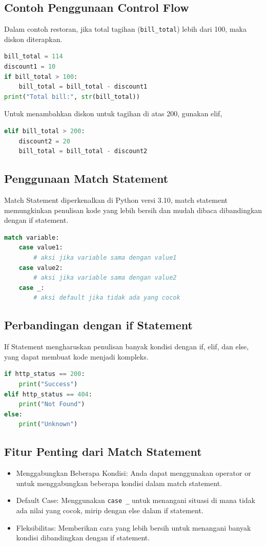\documentclass{article}
\begin{document}
\subsection{Contoh Penggunaan Control Flow}
Dalam contoh restoran, jika total tagihan (\verb|bill_total|) lebih dari 100, maka diskon diterapkan.
\begin{lstlisting}[language=Python, caption={}, captionpos=b]
bill_total = 114
discount1 = 10
if bill_total > 100:
    bill_total = bill_total - discount1
print("Total bill:", str(bill_total))
\end{lstlisting}

Untuk menambahkan diskon untuk tagihan di atas 200, gunakan elif,
\begin{lstlisting}[language=Python, caption={}, captionpos=b]
elif bill_total > 200:
    discount2 = 20
    bill_total = bill_total - discount2
\end{lstlisting}

\subsection{Penggunaan Match Statement}
Match Statement diperkenalkan di Python versi 3.10, match statement memungkinkan penulisan kode yang lebih bersih dan mudah dibaca dibandingkan dengan if statement.
\begin{lstlisting}[language=Python, caption={}, captionpos=b]
match variable:
    case value1:
        # aksi jika variable sama dengan value1
    case value2:
        # aksi jika variable sama dengan value2
    case _:
        # aksi default jika tidak ada yang cocok
\end{lstlisting}

\subsection{Perbandingan dengan if Statement}
If Statement mengharuskan penulisan banyak kondisi dengan if, elif, dan else, yang dapat membuat kode menjadi kompleks.
\begin{lstlisting}[language=Python, caption={}, captionpos=b]
if http_status == 200:
    print("Success")
elif http_status == 404:
    print("Not Found")
else:
    print("Unknown")
\end{lstlisting}

\subsection{Fitur Penting dari Match Statement}
\begin{itemize}
    \item Menggabungkan Beberapa Kondisi: Anda dapat menggunakan operator or untuk menggabungkan beberapa kondisi dalam match statement.
    \item Default Case: Menggunakan \verb|case _| untuk menangani situasi di mana tidak ada nilai yang cocok, mirip dengan else dalam if statement.
    \item Fleksibilitas: Memberikan cara yang lebih bersih untuk menangani banyak kondisi dibandingkan dengan if statement.
\end{itemize}
\end{document}
